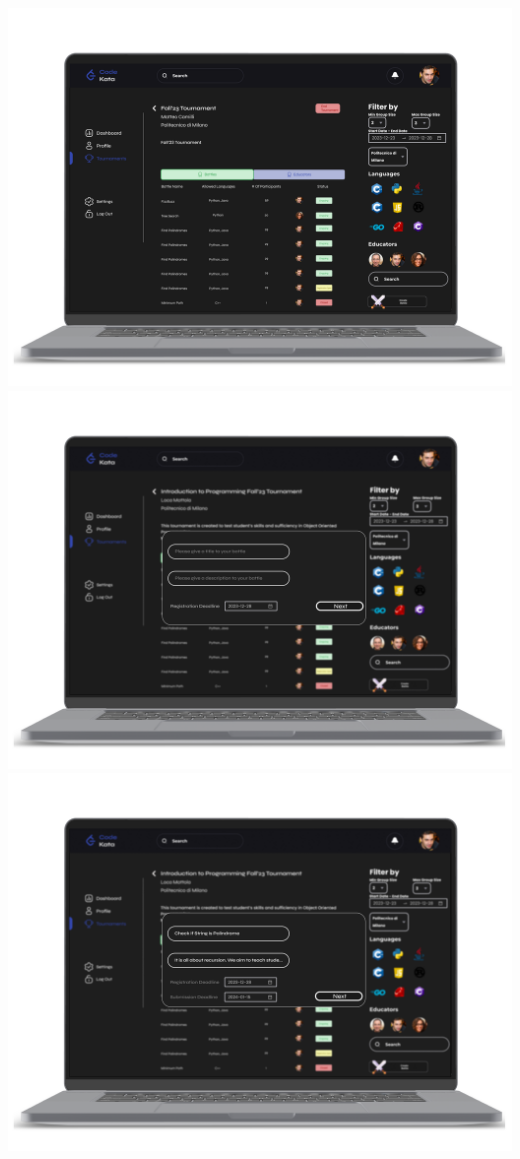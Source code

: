 \begin{center}
\includegraphics[scale=0.13]{Images/ui-ux/educator_creates_battle_1.png}
\includegraphics[scale=0.13]{Images/ui-ux/educator_creates_battle_2.png}
\includegraphics[scale=0.13]{Images/ui-ux/educator_creates_battle_3.png}

\end{center}
